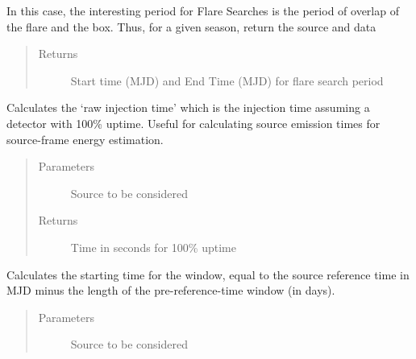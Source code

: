 \documentclass[letterpaper,10pt,english]{sphinxmanual}
\begin{document}
\begin{fulllineitems}
\begin{fulllineitems}
\label{\detokenize{index:flarestack.core.time_pdf.Box.flare_time_mask}}
In this case, the interesting period for Flare Searches is the
period of overlap of the flare and the box. Thus, for a given season,
return the source and data
\begin{quote}\begin{description}
\item[{Returns}] \leavevmode
Start time (MJD) and End Time (MJD) for flare search period

\end{description}\end{quote}

\end{fulllineitems}


\begin{fulllineitems}
\label{\detokenize{index:flarestack.core.time_pdf.Box.raw_injection_time}}
Calculates the ‘raw injection time’ which is the injection time
assuming a detector with 100\% uptime. Useful for calculating source
emission times for source-frame energy estimation.
\begin{quote}\begin{description}
\item[{Parameters}] \leavevmode
{} \textendash{} Source to be considered

\item[{Returns}] \leavevmode
Time in seconds for 100\% uptime

\end{description}\end{quote}

\end{fulllineitems}


\begin{fulllineitems}
\label{\detokenize{index:flarestack.core.time_pdf.Box.sig_t0}}
Calculates the starting time for the window, equal to the
source reference time in MJD minus the length of the pre-reference-time
window (in days).
\begin{quote}\begin{description}
\item[{Parameters}] \leavevmode
{} \textendash{} Source to be considered


\end{description}
\end{quote}
\end{fulllineitems}
\end{fulllineitems}
\end{document}
